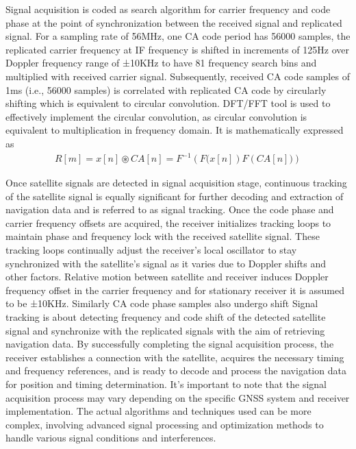 \documentclass[onecolumn]{article}
\providecommand{\brak}[1]{\ensuremath{\left(#1\right)}}
\begin{document}
\begin{enumerate}
\begin{Large}
Signal acquisition is coded as search algorithm for carrier frequency and code phase at the point of synchronization between the received signal and replicated signal. For a sampling rate of 56MHz, one CA code period has 56000 samples, the replicated carrier frequency at IF frequency is
shifted in increments of 125Hz over Doppler frequency range of ±10KHz to have 81 frequency search bins and multiplied with received carrier signal. Subsequently, received CA code samples of 1ms (i.e., 56000 samples) is correlated with replicated CA code by circularly shifting which is equivalent to circular convolution. 
DFT/FFT tool is used to effectively implement the circular convolution, as circular convolution is equivalent to multiplication in frequency domain. It is mathematically expressed as\\


\begin{align}
R[m]=x[n] \circledast CA[n]=F^{-1}\brak{F(x[n]}F\brak{CA[n])}
\end{align}

Once satellite signals are detected in signal acquisition stage, continuous tracking of the satellite signal is equally significant for further decoding and extraction of navigation data and is referred to as signal tracking. Once the code phase and carrier frequency offsets are acquired, the receiver initializes tracking loops to maintain phase and frequency lock with the received satellite signal. These tracking loops continually adjust the receiver's local oscillator to stay synchronized with the satellite's signal as it varies due to Doppler shifts and other factors. Relative motion between satellite and receiver induces Doppler frequency offset in the carrier frequency and for stationary receiver it is assumed to be ±10KHz. Similarly CA code phase samples also undergo shift Signal tracking is about detecting frequency and code shift of the detected satellite signal and synchronize with the replicated signals with the aim of retrieving navigation data.
By successfully completing the signal acquisition process, the receiver establishes a connection with the satellite, acquires the necessary timing and frequency references, and is ready to decode and process the navigation data for position and timing determination.
It's important to note that the signal acquisition process may vary depending on the specific GNSS system and receiver implementation. The actual algorithms and techniques used can be more complex, involving advanced signal processing and optimization methods to handle various signal conditions and interferences.
\end{Large}\\


\end{enumerate}
\end{document}
